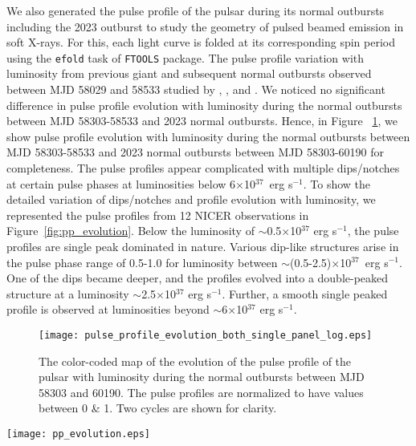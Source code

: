 \documentclass[twocolumn,trackchanges]{aastex631}
\begin{document}
 We also generated the pulse profile of the pulsar during its normal outbursts including the 2023 outburst to study the geometry of pulsed beamed emission in soft X-rays.  For this, each light curve is folded at its corresponding spin period using the \texttt{efold} task of \texttt{FTOOLS} package. The pulse profile variation with luminosity from previous giant and subsequent normal outbursts observed between MJD 58029 and 58533 studied by \citet{2018ApJ...863....9W}, \citet{2023MNRAS.522.6115S}, and \citet{2023ApJ...950...42L}.  We noticed no significant difference in pulse profile evolution with luminosity during the normal outbursts between MJD 58303-58533 and 2023 normal outbursts. Hence, in Figure ~\ref{fig:pp_L_variation}, we show pulse profile evolution with luminosity during the normal outbursts between MJD 58303-58533 and 2023 normal outbursts between MJD 58303-60190 for completeness.  
 The pulse profiles appear complicated with multiple dips/notches at certain pulse phases at luminosities below 6$\times$10$^{37}$~erg s$^{-1}$. To show the detailed variation of dips/notches and profile evolution with luminosity, we represented the pulse profiles from 12 NICER observations in Figure~\ref{fig:pp_evolution}. Below the luminosity of $\sim$0.5$\times$10$^{37}$ erg s$^{-1}$, the pulse profiles are  single peak dominated in nature. Various dip-like structures arise in the pulse phase range of 0.5-1.0 for luminosity between $\sim$(0.5-2.5)$\times$10$^{37}$~erg s$^{-1}$. One of the dips became deeper, and the profiles evolved into a double-peaked structure at a luminosity $\sim$2.5$\times$10$^{37}$ erg s$^{-1}$. Further, a smooth single peaked profile is observed at luminosities beyond $\sim$6$\times$10$^{37}$ erg s$^{-1}$.


\begin{figure}
\hspace{-0.8cm}
 \texttt{[image: pulse\_profile\_evolution\_both\_single\_panel\_log.eps]}
	
 \caption{The color-coded map of the evolution of the pulse profile of the pulsar with luminosity during the normal outbursts between MJD 58303 and 60190. The pulse profiles are normalized to have values between 0 \& 1. Two cycles are shown for clarity. }
    \label{fig:pp_L_variation}
\end{figure}



\begin{figure*}
 \centering
 \texttt{[image: pp\_evolution.eps]}	
 \caption{
NICER pulse profiles covering a broad range of source luminosity during the normal outbursts between MJD 58303 and 60190. Two cycles are shown for clarity. Here, L$_{37}$ stands for 10$^{37}$ erg s$^{-1}$.}
    \label{fig:pp_evolution}
\end{figure*}
\end{document}
